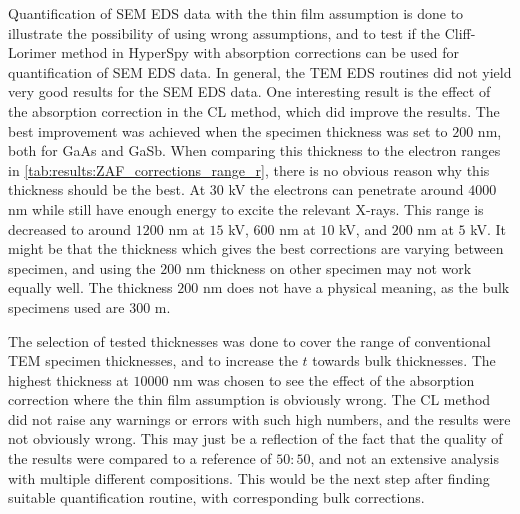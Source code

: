 Quantification of SEM EDS data with the thin film assumption is done to illustrate the possibility of using wrong assumptions, and to test if the Cliff-Lorimer method in HyperSpy with absorption corrections can be used for quantification of SEM EDS data.
In general, the TEM EDS routines did not yield very good results for the SEM EDS data.
One interesting result is the effect of the absorption correction in the CL method, which did improve the results.
The best improvement was achieved when the specimen thickness was set to $200$ nm, both for GaAs and GaSb.
When comparing this thickness to the electron ranges in \cref{tab:results:ZAF_corrections_range_r}, there is no obvious reason why this thickness should be the best.
At $30$ kV the electrons can penetrate around $4000$ nm while still have enough energy to excite the relevant X-rays.
This range is decreased to around $1200$ nm at $15$ kV, $600$ nm at $10$ kV, and $200$ nm at $5$ kV.
It might be that the thickness which gives the best corrections are varying between specimen, and using the $200$ nm thickness on other specimen may not work equally well.
The thickness $200$ nm does not have a physical meaning, as the bulk specimens used are $300$ \textmu m.

The selection of tested thicknesses was done to cover the range of conventional TEM specimen thicknesses, and to increase the $t$ towards bulk thicknesses.
The highest thickness at $10000$ nm was chosen to see the effect of the absorption correction where the thin film assumption is obviously wrong.
The CL method did not raise any warnings or errors with such high numbers, and the results were not obviously wrong.
This may just be a reflection of the fact that the quality of the results were compared to a reference of $50:50$, and not an extensive analysis with multiple different compositions.
This would be the next step after finding suitable quantification routine, with corresponding bulk corrections.



